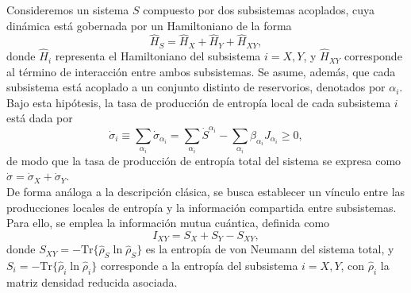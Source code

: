 Consideremos un sistema $S$ compuesto por dos subsistemas acoplados, cuya dinámica está gobernada por un Hamiltoniano de la forma
\[
    \hat{H}_{S} = \hat{H}_{X} + \hat{H}_{Y} + \hat{H}_{XY}, 
\]
donde $\hat{H}_{i}$ representa el Hamiltoniano del subsistema $i = X,Y$, y $\hat{H}_{XY}$ corresponde al término de interacción entre ambos subsistemas. Se asume, además, que cada subsistema está acoplado a un conjunto distinto de reservorios, denotados por $\alpha_{i}$. Bajo esta hipótesis, la tasa de producción de entropía local de cada subsistema $i$ está dada por
\[
    \dot{\sigma}_{i} \equiv \sum_{\alpha_{i}} \dot{\sigma}_{\alpha_{i}} = \sum_{\alpha_{i}} \dot{S}^{\alpha_{i}} - \sum_{\alpha_{i}} \beta_{\alpha_{i}} J_{\alpha_{i}} \geq 0,
\]
de modo que la tasa de producción de entropía total del sistema se expresa como $\dot{\sigma} = \dot{\sigma}_{X} + \dot{\sigma}_{Y}$.
\\

De forma análoga a la descripción clásica, se busca establecer un vínculo entre las producciones locales de entropía y la información compartida entre subsistemas. Para ello, se emplea la información mutua cuántica, definida como
\[
    I_{XY} = S_{X} + S_{Y} - S_{XY},
\]
donde $S_{XY} = -\mathrm{Tr}\{ \hat{\rho}_{S} \ln \hat{\rho}_{S} \}$ es la entropía de von Neumann del sistema total, y $S_{i} = - \mathrm{Tr}\{ \hat{\rho}_{i} \ln \hat{\rho}_{i} \}$ corresponde a la entropía del subsistema $i = X, Y$, con $\hat{\rho}_{i}$ la matriz densidad reducida asociada.
\\


